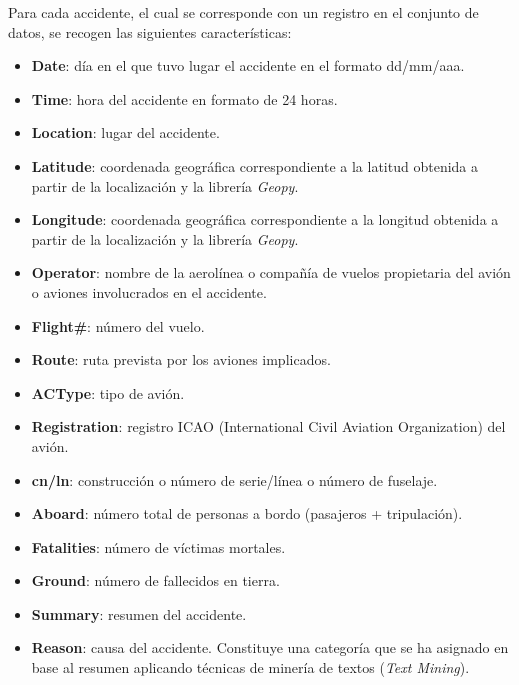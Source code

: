 \documentclass[]{article}
\providecommand{\tightlist}{%
  \setlength{\itemsep}{0pt}\setlength{\parskip}{0pt}}
\begin{document}
Para cada accidente, el cual se corresponde con un registro en el
conjunto de datos, se recogen las siguientes características:

\begin{itemize}
\tightlist
\item
  \textbf{Date}: día en el que tuvo lugar el accidente en el formato
  dd/mm/aaa.\\
\item
  \textbf{Time}: hora del accidente en formato de 24 horas.\\
\item
  \textbf{Location}: lugar del accidente.\\
\item
  \textbf{Latitude}: coordenada geográfica correspondiente a la latitud
  obtenida a partir de la localización y la librería \emph{Geopy}.\\
\item
  \textbf{Longitude}: coordenada geográfica correspondiente a la
  longitud obtenida a partir de la localización y la librería
  \emph{Geopy}.\\
\item
  \textbf{Operator}: nombre de la aerolínea o compañía de vuelos
  propietaria del avión o aviones involucrados en el accidente.\\
\item
  \textbf{Flight\#}: número del vuelo.\\
\item
  \textbf{Route}: ruta prevista por los aviones implicados.\\
\item
  \textbf{ACType}: tipo de avión.\\
\item
  \textbf{Registration}: registro ICAO (International Civil Aviation
  Organization) del avión.\\
\item
  \textbf{cn/ln}: construcción o número de serie/línea o número de
  fuselaje.\\
\item
  \textbf{Aboard}: número total de personas a bordo (pasajeros +
  tripulación).\\
\item
  \textbf{Fatalities}: número de víctimas mortales.\\
\item
  \textbf{Ground}: número de fallecidos en tierra.\\
\item
  \textbf{Summary}: resumen del accidente.\\
\item
  \textbf{Reason}: causa del accidente. Constituye una categoría que se
  ha asignado en base al resumen aplicando técnicas de minería de textos
  (\emph{Text Mining}).
\end{itemize}
\end{document}
